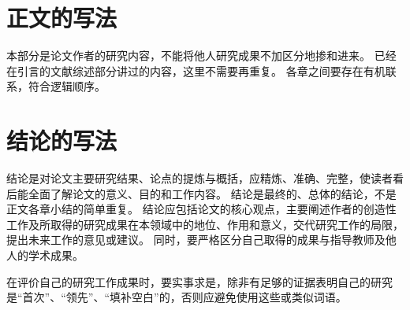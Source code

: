 \section{正文的写法}

本部分是论文作者的研究内容，不能将他人研究成果不加区分地掺和进来。
已经在引言的文献综述部分讲过的内容，这里不需要再重复。
各章之间要存在有机联系，符合逻辑顺序。



\section{结论的写法}

结论是对论文主要研究结果、论点的提炼与概括，应精炼、准确、完整，使读者看后能全面了解论文的意义、目的和工作内容。
结论是最终的、总体的结论，不是正文各章小结的简单重复。
结论应包括论文的核心观点，主要阐述作者的创造性工作及所取得的研究成果在本领域中的地位、作用和意义，交代研究工作的局限，提出未来工作的意见或建议。
同时，要严格区分自己取得的成果与指导教师及他人的学术成果。

在评价自己的研究工作成果时，要实事求是，除非有足够的证据表明自己的研究是“首次”、“领先”、“填补空白”的，否则应避免使用这些或类似词语。

